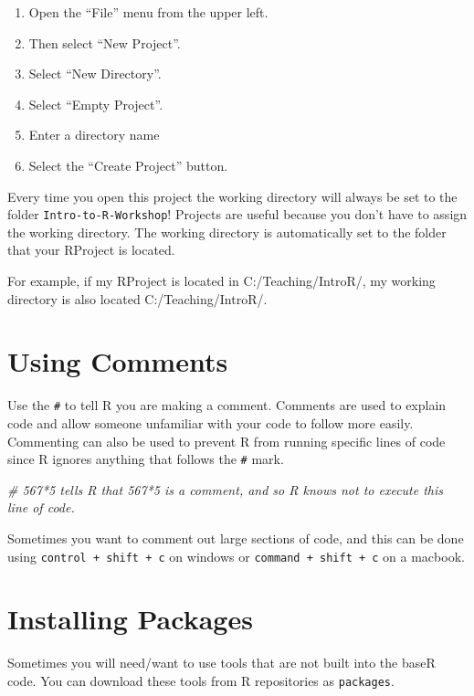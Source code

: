 \documentclass[
]{book}
\newenvironment{Shaded}{\begin{snugshade}}{\end{snugshade}}
\newcommand{\CommentTok}[1]{\textcolor[rgb]{0.56,0.35,0.01}{\textit{#1}}}
\providecommand{\tightlist}{%
  \setlength{\itemsep}{0pt}\setlength{\parskip}{0pt}}
\begin{document}
\begin{enumerate}
\def\labelenumi{\arabic{enumi})}
\tightlist
\item
  Open the ``File'' menu from the upper left.
\item
  Then select ``New Project''.
\item
  Select ``New Directory''.
\item
  Select ``Empty Project''.
\item
  Enter a directory name
\item
  Select the ``Create Project'' button.
\end{enumerate}

Every time you open this project the working directory will always be set to the folder \texttt{Intro-to-R-Workshop}! Projects are useful because you don't have to assign the working directory. The working directory is automatically set to the folder that your RProject is located.

For example, if my RProject is located in C:/Teaching/IntroR/, my working directory is also located C:/Teaching/IntroR/.

\section{Using Comments}\label{using-comments}

Use the \texttt{\#} to tell R you are making a comment. Comments are used to explain code and allow someone unfamiliar with your code to follow more easily. Commenting can also be used to prevent R from running specific lines of code since R ignores anything that follows the \texttt{\#} mark.

\begin{Shaded}
\begin{Highlighting}[]
\CommentTok{\# 567*5 tells R that 567*5 is a comment, and so R knows not to execute this line of code.}
\end{Highlighting}
\end{Shaded}

Sometimes you want to comment out large sections of code, and this can be done using \texttt{control\ +\ shift\ +\ c} on windows or \texttt{command\ +\ shift\ +\ c} on a macbook.

\section{Installing Packages}\label{installing-packages}

Sometimes you will need/want to use tools that are not built into the baseR code. You can download these tools from R repositories as \texttt{packages}.
\end{document}

